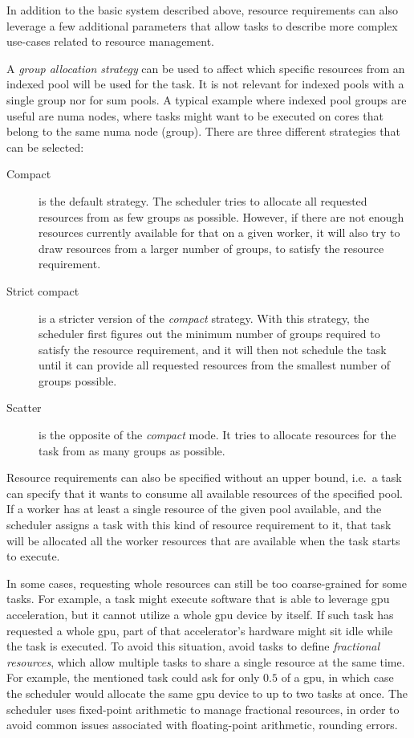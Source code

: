 In addition to the basic system described above, resource requirements can also leverage a few
additional parameters that allow tasks to describe more complex use-cases related to resource
management.

A \emph{group allocation strategy} can be used to affect which specific resources from an indexed pool will
be used for the task. It is not relevant for indexed pools with a single group nor for sum pools. A
typical example where indexed pool groups are useful are \gls{numa} nodes, where tasks
might want to be executed on cores that belong to the same \gls{numa} node (group). There are three
different strategies that can be selected:
\begin{description}
	\item [Compact] is the default strategy. The scheduler tries to allocate all requested
	      resources from as few groups as possible. However, if there are not enough resources currently
	      available for that on a given worker, it will also try to draw resources from a larger number of
	      groups, to satisfy the resource requirement.
	\item [Strict compact] is a stricter version of the \emph{compact} strategy. With this
	      strategy, the scheduler first figures out the minimum number of groups required to satisfy the
	      resource requirement, and it will then not schedule the task until it can provide all requested
	      resources from the smallest number of groups possible.
	\item [Scatter] is the opposite of the \emph{compact} mode. It tries to allocate resources
	      for the task from as many groups as possible.
\end{description}

Resource requirements can also be specified without an upper bound, i.e.\ a task can specify that
it wants to consume all available resources of the specified pool. If a worker has at least a
single resource of the given pool available, and the scheduler assigns a task with this kind of
resource requirement to it, that task will be allocated all the worker resources that are available
when the task starts to execute.

In some cases, requesting whole resources can still be too coarse-grained for some tasks. For
example, a task might execute software that is able to leverage \gls{gpu}
acceleration, but it cannot utilize a whole \gls{gpu} device by itself. If such task
has requested a whole \gls{gpu}, part of that accelerator's hardware might sit idle
while the task is executed. To avoid this situation, \hyperqueue{} avoid tasks to define
\emph{fractional resources}, which allow multiple tasks to share a single resource at the same time.
For example, the mentioned task could ask for only $0.5$ of a
\gls{gpu}, in which case the scheduler would allocate the same
\gls{gpu} device to up to two tasks at once. The scheduler uses fixed-point
arithmetic to manage fractional resources, in order to avoid common issues associated with
floating-point arithmetic, rounding errors.

